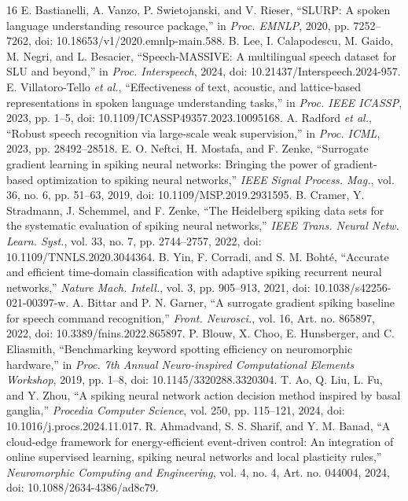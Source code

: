 \documentclass[conference]{IEEEtran}
\begin{document}
\begin{thebibliography}{16}
 E. Bastianelli, A. Vanzo, P. Swietojanski, and V. Rieser, ``SLURP: A spoken language understanding resource package,'' in \emph{Proc. EMNLP}, 2020, pp. 7252--7262, doi: 10.18653/v1/2020.emnlp-main.588.
 B. Lee, I. Calapodescu, M. Gaido, M. Negri, and L. Besacier, ``Speech-MASSIVE: A multilingual speech dataset for SLU and beyond,'' in \emph{Proc. Interspeech}, 2024, doi: 10.21437/Interspeech.2024-957.
 E. Villatoro-Tello \emph{et al.}, ``Effectiveness of text, acoustic, and lattice-based representations in spoken language understanding tasks,'' in \emph{Proc. IEEE ICASSP}, 2023, pp. 1--5, doi: 10.1109/ICASSP49357.2023.10095168.
 A. Radford \emph{et al.}, ``Robust speech recognition via large-scale weak supervision,'' in \emph{Proc. ICML}, 2023, pp. 28492--28518.
 E. O. Neftci, H. Mostafa, and F. Zenke, ``Surrogate gradient learning in spiking neural networks: Bringing the power of gradient-based optimization to spiking neural networks,'' \emph{IEEE Signal Process. Mag.}, vol. 36, no. 6, pp. 51--63, 2019, doi: 10.1109/MSP.2019.2931595.
 B. Cramer, Y. Stradmann, J. Schemmel, and F. Zenke, ``The Heidelberg spiking data sets for the systematic evaluation of spiking neural networks,'' \emph{IEEE Trans. Neural Netw. Learn. Syst.}, vol. 33, no. 7, pp. 2744--2757, 2022, doi: 10.1109/TNNLS.2020.3044364.
 B. Yin, F. Corradi, and S. M. Boht\'e, ``Accurate and efficient time-domain classification with adaptive spiking recurrent neural networks,'' \emph{Nature Mach. Intell.}, vol. 3, pp. 905--913, 2021, doi: 10.1038/s42256-021-00397-w.
 A. Bittar and P. N. Garner, ``A surrogate gradient spiking baseline for speech command recognition,'' \emph{Front. Neurosci.}, vol. 16, Art. no. 865897, 2022, doi: 10.3389/fnins.2022.865897.
 P. Blouw, X. Choo, E. Hunsberger, and C. Eliasmith, ``Benchmarking keyword spotting efficiency on neuromorphic hardware,'' in \emph{Proc. 7th Annual Neuro-inspired Computational Elements Workshop}, 2019, pp. 1--8, doi: 10.1145/3320288.3320304.
 T. Ao, Q. Liu, L. Fu, and Y. Zhou, ``A spiking neural network action decision method inspired by basal ganglia,'' \emph{Procedia Computer Science}, vol. 250, pp. 115--121, 2024, doi: 10.1016/j.procs.2024.11.017.
 R. Ahmadvand, S. S. Sharif, and Y. M. Banad, ``A cloud-edge framework for energy-efficient event-driven control: An integration of online supervised learning, spiking neural networks and local plasticity rules,'' \emph{Neuromorphic Computing and Engineering}, vol. 4, no. 4, Art. no. 044004, 2024, doi: 10.1088/2634-4386/ad8c79.

\end{thebibliography}
\end{document}

